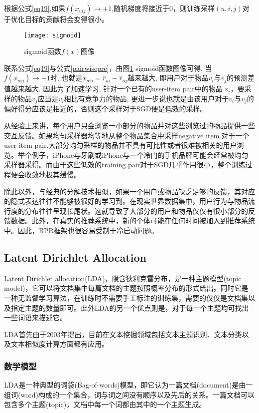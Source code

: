 根据公式\eqref{eq19},如果$f \left(x_{uij}\right) \rightarrow +1$,随机梯度将接近于0，则训练采样$\left(u,i,j\right)$对于优化目标的贡献将会变得很小。
\begin{figure}[htbp]
	\begin{center}
		\texttt{[image: sigmoid]}
		\caption{sigmoid函数$f \left(x\right) $图像}
		\label{gra-sigmoid}
	\end{center}
\end{figure}

联系公式\eqref{eq19}与公式\eqref{pairwisepre}，由图\ref{gra-sigmoid} sigmoid函数图像可得, 当$f \left(x_{uij}\right) \rightarrow +1$时, 也就是$x_{uij} = \hat{r}_{ui} - \hat{r}_{uj}$越来越大, 即用户对于物品$v_i$与$v_j$的预测差值越来越大. 因此为了加速学习, 针对一个已有的user-item pair中的物品 $v_i$，要采样的物品$v_j$应当是$v_i$相比有竞争力的物品, 更进一步说也就是由该用户对于$v_i$与$v_j$的偏好得分应该是相近的，否则这个采样对于SGD便是低效的采样。

从经验上来讲，每个用户只会浏览一小部分的物品并对这些浏览过的物品提供一些交互反馈。如果均匀采样器均等地从整个物品集合中采样negative  item.对于一个user-item  pair,大部分均匀采样的物品并不具有可比性或者很难被相关的用户浏览。举个例子，iPhone与牙刷或iPhone与一个冷门的手机品牌可能会经常被均匀采样器采得。而由于这些低效的training pair对于SGD几乎作用很小，整个训练过程便会收敛地极其缓慢。

除此以外，与经典的分解技术相似，如果一个用户或物品缺乏足够的反馈，其对应的隐式表达往往不能够被很好的学习到。在现实世界数据集中，用户行为与物品流行度的分布往往呈现长尾状。这就导致了大部分的用户和物品仅仅有很小部分的反馈数据。此外，在真实的推荐系统中，新的个体可能在任何时间被加入到推荐系统中。因此，BPR框架也很容易受制于冷启动问题。

\subsection{Latent Dirichlet Allocation}
Latent Dirichlet allocation(LDA)，隐含狄利克雷分布，是一种主题模型(topic model)，它可以将文档集中每篇文档的主题按照概率分布的形式给出。同时它是一种无监督学习算法，在训练时不需要手工标注的训练集，需要的仅仅是文档集以及指定主题的数量即可。此外LDA的另一个优点则是，对于每一个主题均可找出一些词语来描述它。

LDA首先由于2003年提出，目前在文本挖掘领域包括文本主题识别、文本分类以及文本相似度计算方面都有应用。


\subsubsection{数学模型}
LDA是一种典型的词袋(Bag-of-words)模型，即它认为一篇文档(document)是由一组词(word)构成的一个集合，词与词之间没有顺序以及先后的关系。一篇文档可以包含多个主题(topic)，文档中每一个词都由其中的一个主题生成。

